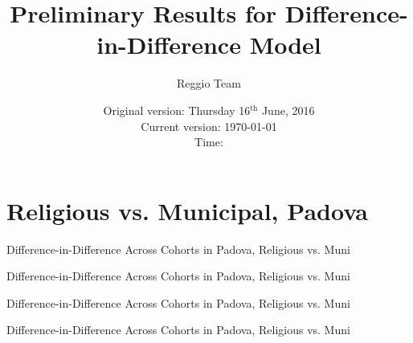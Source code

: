 \documentclass[11pt]{article}
\begin{document}
\title{Preliminary Results for Difference-in-Difference Model}
\author{Reggio Team}
\date{Original version: Thursday  16$^{\text{th}}$ June, 2016 \\ Current version: \today \\ \vspace{1em} Time: \currenttime}
\maketitle


\doublespacing

\section{Religious vs. Municipal, Padova}
\begin{table}[H]
\begin{center}
	\caption{Difference-in-Difference Across Cohorts in Padova, Religious vs. Muni}
	\scalebox{0.80}{
		}
\end{center}

\end{table}

\begin{table}[H]
\begin{center}
	\caption{Difference-in-Difference Across Cohorts in Padova, Religious vs. Muni}
	\scalebox{0.80}{
		}
\end{center}

\end{table}

\begin{table}[H]
\begin{center}
	\caption{Difference-in-Difference Across Cohorts in Padova, Religious vs. Muni}
	\scalebox{0.80}{
		}
\end{center}

\end{table}


\begin{table}[H]
\begin{center}
	\caption{Difference-in-Difference Across Cohorts in Padova, Religious vs. Muni}
	\scalebox{0.80}{
		}
\end{center}

\end{table}
\end{document}
